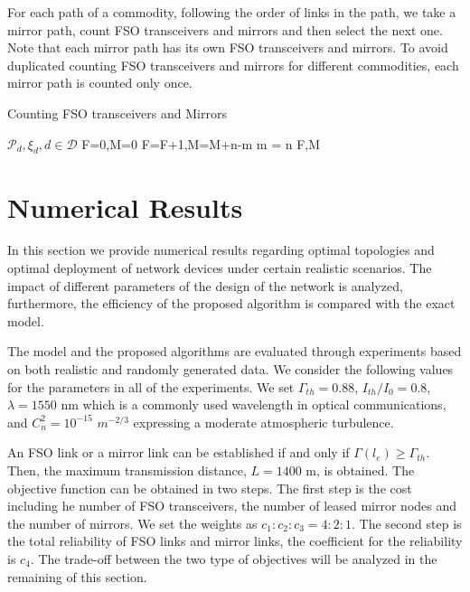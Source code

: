 \documentclass[onecolumn,11pt,draftclsnofoot]{IEEEtran}
\begin{document}
For each path of a commodity, following the order of links in the path, we take a mirror path, count FSO transceivers and mirrors and then select the next one. Note that each mirror path has its own FSO transceivers and mirrors.
To avoid duplicated counting FSO transceivers and mirrors for different commodities, each mirror path is counted only  once.

\begin{algorithm}
\caption{Counting FSO transceivers and Mirrors}
\label{alg:deploy}
\begin{algorithmic}[1]
\REQUIRE $\mathcal P_d, \xi_d, d \in \mathcal D$
    \STATE F=0,M=0
                          \STATE F=F+1,M=M+n-m
                          \STATE m = n
                      \ENDIF
                  \ENDIF
              \ENDFOR
          \ENDFOR
      \ENDFOR
     \ENDFOR
\RETURN F,M
\end{algorithmic}
\end{algorithm}

\section{Numerical Results} \label{sec:numerical}
In this section we provide numerical results regarding optimal topologies and optimal deployment of network devices under certain realistic scenarios. The impact of different parameters of the design of the network is analyzed, furthermore, the efficiency of the proposed algorithm is compared with the exact model.

The model and the proposed algorithms are evaluated through experiments based on both realistic and randomly generated data. We consider the following values for the parameters in all of the experiments. We set $\Gamma_{th} = 0.88$, $I_{th}/I_0 = 0.8$,  $\lambda = 1550$ nm which is a commonly used wavelength in optical communications, and $C^2_n = 10^{-15}$ $m^{-2/3}$ expressing a moderate atmospheric turbulence.

An FSO link or a mirror link can be established if and only if $\Gamma(l_e) \geq \Gamma_{th}$. Then, the maximum transmission distance, $L=1400$ m, is obtained. The objective function can be obtained in two steps. The first step is the cost including he number of FSO transceivers, the number of leased mirror nodes and the number of mirrors. We set the weights as $c_1 : c_2 :c_3 = 4:2:1$. The second step is the total reliability of FSO links and mirror links, the coefficient for the reliability is $c_4$. The trade-off between the two type of objectives will be analyzed in the remaining of this section.
\end{document}

